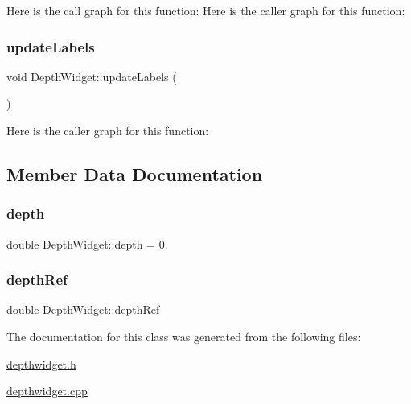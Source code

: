 Here is the call graph for this function\+:
Here is the caller graph for this function\+:
\mbox{\label{class_depth_widget_a96a2f50285066aa3749b134e5bfa8813}} 
\subsubsection{\texorpdfstring{update\+Labels}{updateLabels}}
{\footnotesize\ttfamily void Depth\+Widget\+::update\+Labels (\begin{DoxyParamCaption}{ }\end{DoxyParamCaption})\hspace{0.3cm}{\ttfamily [slot]}}

Here is the caller graph for this function\+:


\subsection{Member Data Documentation}
\mbox{\label{class_depth_widget_acfea82b88c72bc7103043f4c64484bdd}} 
\subsubsection{\texorpdfstring{depth}{depth}}
{\footnotesize\ttfamily double Depth\+Widget\+::depth = 0.}

\mbox{\label{class_depth_widget_a2c5e1070ef99fc0d5c92f13a482cf18a}} 
\subsubsection{\texorpdfstring{depth\+Ref}{depthRef}}
{\footnotesize\ttfamily double Depth\+Widget\+::depth\+Ref}



The documentation for this class was generated from the following files\+:\begin{DoxyCompactItemize}
\item 
\mbox{\hyperlink{depthwidget_8h}{depthwidget.\+h}}\item 
\mbox{\hyperlink{depthwidget_8cpp}{depthwidget.\+cpp}}\end{DoxyCompactItemize}
